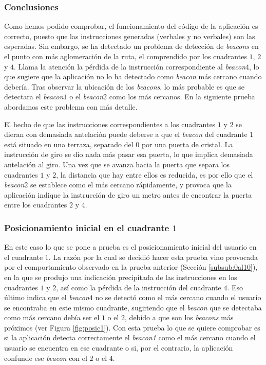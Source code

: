 \subsubsection*{Conclusiones}

Como hemos podido comprobar, el funcionamiento del código de la aplicación es correcto, puesto que las instrucciones generadas (verbales y no verbales) son las esperadas. Sin embargo, se ha detectado un problema de detección de \textit{beacons} en el punto con más aglomeración de la ruta, el comprendido por los cuadrantes $1$, $2$ y $4$. Llama la atención la pérdida de la instrucción correspondiente al \textit{beacon$4$}, lo que sugiere que la aplicación no lo ha detectado como \textit{beacon} más cercano cuando debería. Tras observar la ubicación de los \textit{beacons}, lo más probable es que se detectara el \textit{beacon$1$} o el \textit{beacon$2$} como los más cercanos. En la siguiente prueba abordamos este problema con más detalle. 

El hecho de que las instrucciones correspondientes a los cuadrantes $1$ y $2$ se dieran con demasiada antelación puede deberse a que el \textit{beacon} del cuadrante $1$ está situado en una terraza, separado del $0$ por una puerta de cristal. La instrucción de giro se dio nada más pasar esa puerta, lo que implica demasiada antelación al giro. Una vez que se avanza hacia la puerta que separa los cuadrantes $1$ y $2$, la distancia que hay entre ellos es reducida, es por ello que el \textit{beacon$2$} se establece como el más cercano rápidamente, y provoca que la aplicación indique la instrucción de giro un metro antes de encontrar la puerta entre los cuadrantes $2$ y $4$.


\subsubsection{Posicionamiento inicial en el cuadrante $1$}
\label{subsub:pos1}

En este caso lo que se pone a prueba es el posicionamiento inicial del usuario en el cuadrante $1$. La razón por la cual se decidió hacer esta prueba vino provocada por el comportamiento observado en la prueba anterior (Sección \ref{subsub:0al10}), en la que se produjo una indicación precipitada de las instrucciones en los cuadrantes $1$ y $2$, así como la pérdida de la instrucción del cuadrante $4$. Eso último indica que el \textit{beacon$4$} no se detectó como el más cercano cuando el usuario se encontraba en este mismo cuadrante, sugiriendo que el \textit{beacon} que se detectaba como más cercano debía ser el $1$ o el $2$, debido a que son los \textit{beacons} más próximos (ver Figura \ref{fig:posic1}). Con esta prueba lo que se quiere comprobar es si la aplicación detecta correctamente el \textit{beacon1} como el más cercano cuando el usuario se encuentra en ese cuadrante o si, por el contrario, la aplicación confunde ese \textit{beacon} con el $2$ o el $4$.


